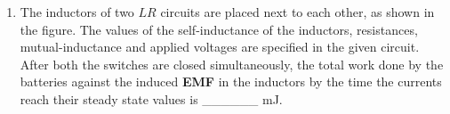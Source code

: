 
\begin{enumerate}
    \item The inductors of two \(LR\) circuits are placed next to each other, as shown in the figure. The values of the self-inductance of the inductors, resistances, mutual-inductance and applied voltages are specified in the given circuit. After both the switches are closed simultaneously, the total work done by the batteries against the induced \textbf{EMF} in the inductors by the time the currents reach their steady state values is \_\_\_\_\_\_ mJ.
    
    \begin{center}
    \end{center}
\end{enumerate}
